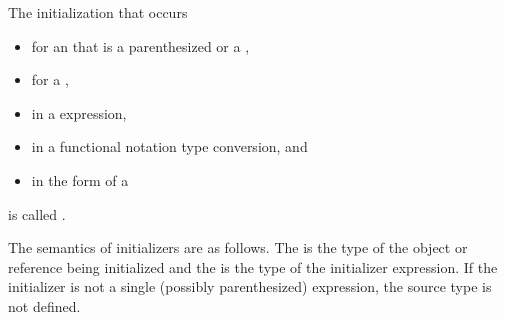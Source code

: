 \pnum
The initialization that occurs
\begin{itemize}
\item for an  that is a
parenthesized  or a ,
\item for a ,
\item in a  expression,
\item in a functional notation type conversion, and
\item in the  form of a 
\end{itemize}
is called
.

\pnum
The semantics of initializers are as follows.
The
%
is the type of the object or reference being initialized and the
is the type of the initializer expression.
If the initializer is not a single (possibly parenthesized) expression, the
source type is not defined.
